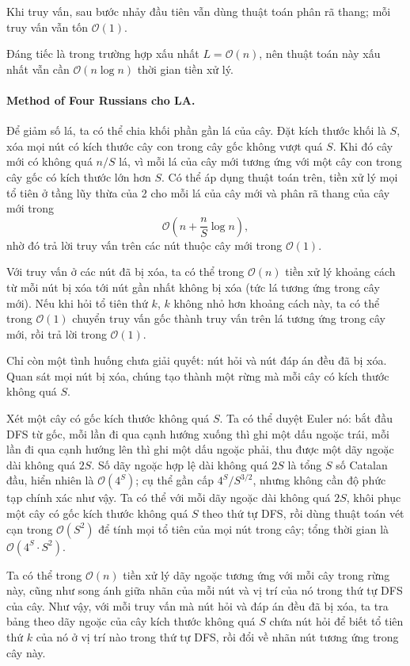 \documentclass[11pt]{article}
\newcommand{\Oh}{\mathcal{O}}
\begin{document}
Khi truy vấn, sau bước nhảy đầu tiên vẫn dùng thuật toán phân rã thang; mỗi
truy vấn vẫn tốn \(\Oh(1)\).

Đáng tiếc là trong trường hợp xấu nhất \(L=\Oh(n)\), nên thuật toán này xấu
nhất vẫn cần \(\Oh(n\log n)\) thời gian tiền xử lý.

\paragraph{Method of Four Russians cho LA.}
Để giảm số lá, ta có thể chia khối phần gần lá của cây. Đặt kích thước khối
là \(S\), xóa mọi nút có kích thước cây con trong cây gốc không vượt quá \(S\).
Khi đó cây mới có không quá \(n/S\) lá, vì mỗi lá của cây mới tương ứng với
một cây con trong cây gốc có kích thước lớn hơn \(S\). Có thể áp dụng thuật
toán trên, tiền xử lý mọi tổ tiên ở tầng lũy thừa của 2 cho mỗi lá của cây
mới và phân rã thang của cây mới trong
\[
  \Oh\left(n+\frac nS\log n\right),
\]
nhờ đó trả lời truy vấn trên các nút thuộc cây mới trong \(\Oh(1)\).

Với truy vấn ở các nút đã bị xóa, ta có thể trong \(\Oh(n)\) tiền xử lý
khoảng cách từ mỗi nút bị xóa tới nút gần nhất không bị xóa (tức lá tương ứng
trong cây mới). Nếu khi hỏi tổ tiên thứ \(k\), \(k\) không nhỏ hơn khoảng cách
này, ta có thể trong \(\Oh(1)\) chuyển truy vấn gốc thành truy vấn trên lá
tương ứng trong cây mới, rồi trả lời trong \(\Oh(1)\).

Chỉ còn một tình huống chưa giải quyết: nút hỏi và nút đáp án đều đã bị xóa.
Quan sát mọi nút bị xóa, chúng tạo thành một rừng mà mỗi cây có kích thước
không quá \(S\).

Xét một cây có gốc kích thước không quá \(S\). Ta có thể duyệt Euler nó: bắt
đầu DFS từ gốc, mỗi lần đi qua cạnh hướng xuống thì ghi một dấu ngoặc trái,
mỗi lần đi qua cạnh hướng lên thì ghi một dấu ngoặc phải, thu được một dãy
ngoặc dài không quá \(2S\). Số dãy ngoặc hợp lệ dài không quá \(2S\) là tổng
\(S\) số Catalan đầu, hiển nhiên là \(\Oh(4^S)\); cụ thể gần cấp
\(4^S/S^{3/2}\), nhưng không cần độ phức tạp chính xác như vậy. Ta có thể với
mỗi dãy ngoặc dài không quá \(2S\), khôi phục một cây có gốc kích thước không
quá \(S\) theo thứ tự DFS, rồi dùng thuật toán vét cạn trong \(\Oh(S^2)\) để
tính mọi tổ tiên của mọi nút trong cây; tổng thời gian là \(\Oh(4^S\cdot S^2)\).

Ta có thể trong \(\Oh(n)\) tiền xử lý dãy ngoặc tương ứng với mỗi cây trong
rừng này, cũng như song ánh giữa nhãn của mỗi nút và vị trí của nó trong thứ
tự DFS của cây. Như vậy, với mỗi truy vấn mà nút hỏi và đáp án đều đã bị xóa,
ta tra bảng theo dãy ngoặc của cây kích thước không quá \(S\) chứa nút hỏi để
biết tổ tiên thứ \(k\) của nó ở vị trí nào trong thứ tự DFS, rồi đổi về nhãn
nút tương ứng trong cây này.
\end{document}
